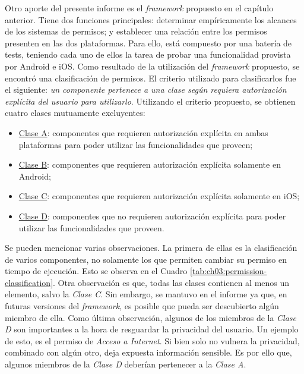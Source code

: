 Otro aporte del presente informe es el \emph{framework} propuesto en el capítulo anterior. Tiene dos funciones principales: determinar empíricamente los alcances de los sistemas de permisos; y establecer una relación entre los permisos presenten en las dos plataformas. Para ello, está compuesto por una batería de tests, teniendo cada uno de ellos la tarea de probar una funcionalidad provista por Android e iOS. Como resultado de la utilización del \emph{framework} propuesto, se encontró una clasificación de permisos. El criterio utilizado para clasificarlos fue el siguiente: \emph{un componente pertenece a una clase según requiera autorización explícita del usuario para utilizarlo}. Utilizando el criterio propuesto, se obtienen cuatro clases mutuamente excluyentes:
\begin{itemize}
    \item \underline{Clase A}: componentes que requieren autorización explícita en ambas plataformas para poder utilizar las funcionalidades que proveen;
    \item \underline{Clase B}: componentes que requieren autorización explícita solamente en Android;
    \item \underline{Clase C}: componentes que requieren autorización explícita solamente en iOS;
    \item \underline{Clase D}: componentes que no requieren autorización explícita para poder utilizar las funcionalidades que proveen.
\end{itemize}
Se pueden mencionar varias observaciones. La primera de ellas es la clasificación de varios componentes, no solamente los que permiten cambiar su permiso en tiempo de ejecución. Esto se observa en el Cuadro \ref{tab:ch03:permission-classification}. Otra observación es que, todas las clases contienen al menos un elemento, salvo la \emph{Clase C}. Sin embargo, se mantuvo en el informe ya que, en futuras versiones del \emph{framework}, es posible que pueda ser descubierto algún miembro de ella. Como última observación, algunos de los miembros de la \emph{Clase D} son importantes a la hora de resguardar la privacidad del usuario. Un ejemplo de esto, es el permiso de \emph{Acceso a Internet}. Si bien solo no vulnera la privacidad, combinado con algún otro, deja expuesta información sensible. Es por ello que, algunos miembros de la \emph{Clase D} deberían pertenecer a la \emph{Clase A}.\\

